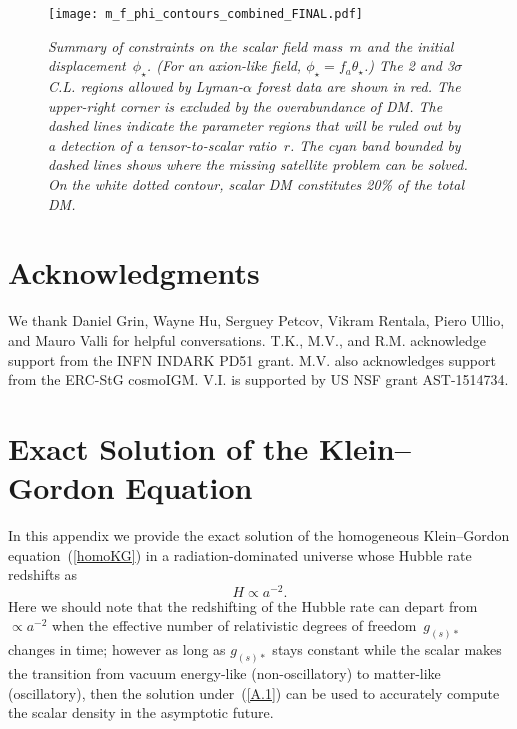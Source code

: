 \documentclass[11pt,nofootinbib]{article}
\numberwithin{equation}{section}
\begin{document}
\begin{figure}[t]
  \begin{center}
  \begin{center}
  \texttt{[image: m\_f\_phi\_contours\_combined\_FINAL.pdf]}
  \end{center}
   \caption{\emph{Summary of constraints on the scalar field mass~$m$
   and the initial displacement~$\phi_\star$.
   (For an axion-like field, $\phi_\star = f_a \theta_\star$.)
   The 2 and 3$\sigma$ C.L. regions allowed by Lyman-$\alpha$ forest data are shown in
   red. The upper-right corner is excluded by the overabundance of
   DM. The dashed lines indicate the parameter regions that will be
   ruled out by a detection of a tensor-to-scalar ratio~$r$. The cyan
   band bounded by dashed lines shows where the missing satellite
   problem can be solved. On the white dotted contour, scalar DM
   constitutes 20\% of the total DM.}} 
  \label{fig:summary}
  \end{center}
\end{figure}


\section*{Acknowledgments}


We thank Daniel Grin, Wayne Hu, Serguey Petcov, Vikram Rentala, Piero
Ullio, and Mauro Valli for helpful conversations. 
T.K., M.V., and R.M. acknowledge support from the INFN INDARK PD51 grant. 
M.V. also acknowledges support from the ERC-StG cosmoIGM.
V.I. is supported by US NSF grant AST-1514734.


\appendix


\section{Exact Solution of the Klein--Gordon Equation}
\label{app:onset}

In this appendix we provide the exact solution of the
homogeneous Klein--Gordon equation~(\ref{homoKG}) in a
radiation-dominated universe whose Hubble rate redshifts as
\begin{equation}
 H \propto a^{-2}.
  \label{A.1}
\end{equation}
Here we should note that the redshifting of the Hubble rate can depart
from $\propto a^{-2}$ 
when the effective number of relativistic degrees of freedom~$g_{(s)*}$
changes in time;
however as long as $g_{(s)*}$ stays constant while
the scalar makes the transition from vacuum energy-like
(non-oscillatory) to matter-like (oscillatory),
then the solution under~(\ref{A.1}) can be used to
accurately compute the scalar density in the
asymptotic future. 
\end{document}
